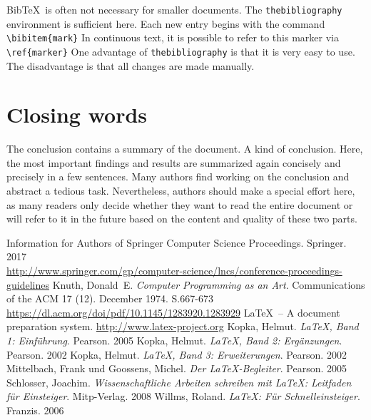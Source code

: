 \documentclass{llncs}
\begin{document}
Bib\TeX\ is often not necessary for smaller documents. The \texttt{thebibliography} environment is sufficient here. Each new entry begins with the command \verb!\bibitem{mark}! In continuous text, it is possible to refer to this marker via \verb!\ref{marker}! One advantage of \texttt{thebibliography} is that it is very easy to use. The disadvantage is that all changes are made manually.

\section{Closing words}

The conclusion contains a summary of the document. A kind of conclusion. Here, the most important findings and results are summarized again concisely and precisely in a few sentences. Many authors find working on the conclusion and abstract a tedious task. Nevertheless, authors should make a special effort here, as many readers only decide whether they want to read the entire document or will refer to it in the future based on the content and quality of these two parts.



\begin{thebibliography}{5}
  
  Information for Authors of Springer Computer Science Proceedings. Springer. 2017\\
  \url{http://www.springer.com/gp/computer-science/lncs/conference-proceedings-guidelines}
  Knuth, Donald~E. \textsl{Computer Programming as an Art}. Communications of the ACM 17 (12). December 1974. S.667-673\\
  \url{https://dl.acm.org/doi/pdf/10.1145/1283920.1283929}
  \LaTeX\ -- A document preparation system.
  \url{http://www.latex-project.org}
  Kopka, Helmut. \textsl{\LaTeX, Band 1: Einführung}. Pearson. 2005
  Kopka, Helmut. \textsl{\LaTeX, Band 2: Ergänzungen}. Pearson. 2002
  Kopka, Helmut. \textsl{\LaTeX, Band 3: Erweiterungen}. Pearson. 2002
  Mittelbach, Frank und Goossens, Michel. \textsl{Der LaTeX-Begleiter}. Pearson. 2005
  Schlosser, Joachim. \textsl{Wissenschaftliche Arbeiten schreiben mit LaTeX: Leitfaden für Einsteiger}. Mitp-Verlag. 2008
  Willms, Roland. \textsl{\LaTeX: Für Schnelleinsteiger}. Franzis. 2006
\end{thebibliography}
\end{document}
